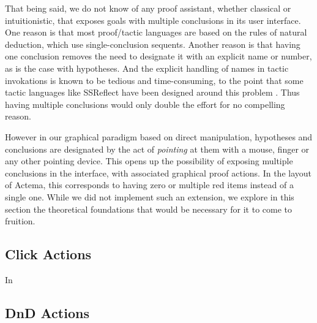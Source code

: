That being said, we do not know of any proof assistant, whether classical or
intuitionistic, that exposes goals with multiple conclusions in its user
interface. One reason is that most proof/tactic languages are based on the rules
of natural deduction, which use single-conclusion sequents. Another reason is
that having one conclusion removes the need to designate it with an explicit
name or number, as is the case with hypotheses. And the explicit handling of
names in tactic invokations is known to be tedious and time-consuming, to the
point that some tactic languages like SSReflect have been designed around this
problem . Thus having multiple conclusions would only double the
effort for no compelling reason.

However in our graphical paradigm based on direct manipulation, hypotheses and
conclusions are designated by the act of \emph{pointing} at them with a mouse,
finger or any other pointing device. This opens up the possibility of exposing
multiple conclusions in the interface, with associated graphical proof actions.
In the layout of Actema, this corresponds to having zero or multiple red items
instead of a single one. While we did not implement such an extension, we
explore in this section the theoretical foundations that would be necessary for
it to come to fruition.

\subsection{Click Actions}

In 


\subsection{DnD Actions}

